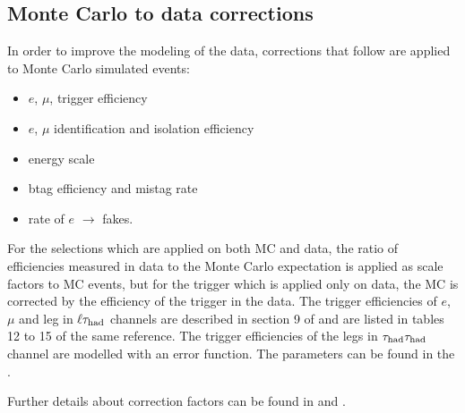 \subsection{Monte Carlo to data corrections}
\label{sec:scaleFactors}
In order to improve the modeling of the data, corrections that follow are
 applied  to Monte Carlo simulated events:
\begin{itemize}
\item $e$, $\mu$, \Tau trigger efficiency
\item $e$, $\mu$ identification and isolation efficiency
\item \Tau energy scale
\item btag efficiency and mistag rate
\item rate of $e$ $\rightarrow$ \Tau  fakes.
\end{itemize}
For the selections which are applied on both MC and data, the ratio of efficiencies measured in data to the Monte Carlo expectation is applied as scale factors to MC events, but for the trigger which is applied only on data, the MC is corrected by the efficiency of the trigger in the data.
The trigger efficiencies of $e$, $\mu$ and \Tau leg in $\ell\tau_{\rm had}$ channels are described in section 9 of \cite{CMS_AN_2013-171}  and are listed in 
tables 12 to 15 of the same reference. The trigger efficiencies of the \Tau legs in $\tau_{\rm had}\tau_{\rm had}$ channel are modelled with an error function. 
The parameters can be found in the \cite{HiggsTauTautwiki}.
 
Further details about correction factors can be found  in   \cite{HiggsTauTautwiki} and  \cite{CMS_AN_2013-171}.


 
